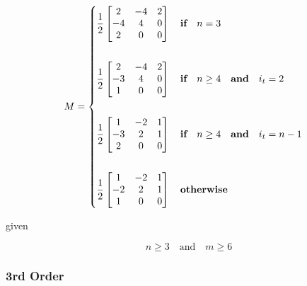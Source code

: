 \documentclass{article}
\begin{document}
        \begin{equation}
        M = \begin{dcases} 
            \frac{1}{2}\begin{bmatrix} 2 & -4 & 2 \\
                                        -4 & 4 & 0 \\
                                        2 & 0 & 0 \end{bmatrix} \quad \textbf{if} \quad n = 3 \\\\
            \frac{1}{2} \begin{bmatrix} 2 & -4 & 2 \\
                                        -3 & 4 & 0 \\
                                        1 & 0 & 0 \end{bmatrix} \quad \textbf{if} \quad n \geq 4  \quad \textbf{and} \quad i_t = 2 \\\\
            \frac{1}{2} \begin{bmatrix} 1 & -2 & 1 \\
                                        -3 & 2 & 1 \\
                                        2 & 0 & 0 \end{bmatrix} \quad \textbf{if} \quad n \geq 4  \quad \textbf{and} \quad i_t = n-1 \\\\
            \frac{1}{2} \begin{bmatrix} 1 & -2 & 1 \\
                                        -2 & 2 & 1 \\
                                        1 & 0 & 0 \end{bmatrix} \quad \textbf{otherwise}
        \end{dcases}
    \end{equation}
    
    given
    
    \begin{equation}
        \quad n \geq 3 \quad \text{and} \quad m \geq 6
    \end{equation}
    
    \subsubsection{3rd Order} \label{sec: Clamped 3rd order matrices}
    
\end{document}
